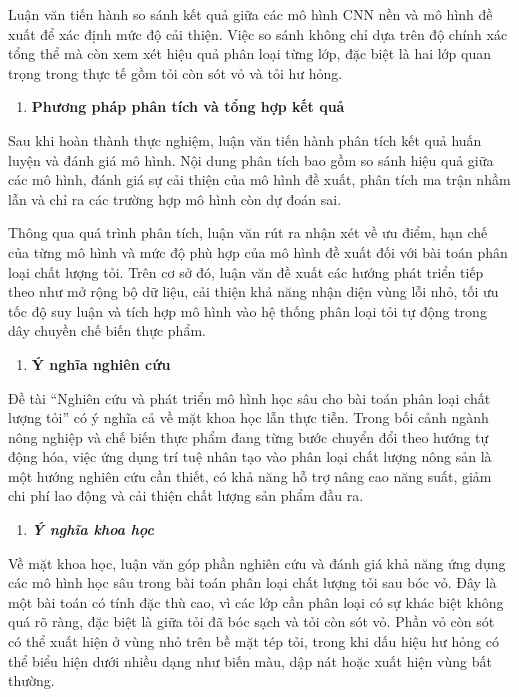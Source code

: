 \documentclass[
]{article}
\begin{document}
Luận văn tiến hành so sánh kết quả giữa các mô hình CNN nền và mô hình
đề xuất để xác định mức độ cải thiện. Việc so sánh không chỉ dựa trên độ
chính xác tổng thể mà còn xem xét hiệu quả phân loại từng lớp, đặc biệt
là hai lớp quan trọng trong thực tế gồm tỏi còn sót vỏ và tỏi hư hỏng.

\begin{enumerate}
\def\labelenumi{\alph{enumi}.}
\setcounter{enumi}{6}
\item
  \textbf{Phương pháp phân tích và tổng hợp kết quả}
\end{enumerate}

Sau khi hoàn thành thực nghiệm, luận văn tiến hành phân tích kết quả
huấn luyện và đánh giá mô hình. Nội dung phân tích bao gồm so sánh hiệu
quả giữa các mô hình, đánh giá sự cải thiện của mô hình đề xuất, phân
tích ma trận nhầm lẫn và chỉ ra các trường hợp mô hình còn dự đoán sai.

Thông qua quá trình phân tích, luận văn rút ra nhận xét về ưu điểm, hạn
chế của từng mô hình và mức độ phù hợp của mô hình đề xuất đối với bài
toán phân loại chất lượng tỏi. Trên cơ sở đó, luận văn đề xuất các hướng
phát triển tiếp theo như mở rộng bộ dữ liệu, cải thiện khả năng nhận
diện vùng lỗi nhỏ, tối ưu tốc độ suy luận và tích hợp mô hình vào hệ
thống phân loại tỏi tự động trong dây chuyền chế biến thực phẩm.

\begin{enumerate}
\def\labelenumi{\arabic{enumi}.}
\setcounter{enumi}{4}
\item
  \protect{}\label{_Toc232111988}{}\textbf{Ý nghĩa nghiên
  cứu}
\end{enumerate}

Đề tài ``Nghiên cứu và phát triển mô hình học sâu cho bài toán phân loại
chất lượng tỏi'' có ý nghĩa cả về mặt khoa học lẫn thực tiễn. Trong bối
cảnh ngành nông nghiệp và chế biến thực phẩm đang từng bước chuyển đổi
theo hướng tự động hóa, việc ứng dụng trí tuệ nhân tạo vào phân loại
chất lượng nông sản là một hướng nghiên cứu cần thiết, có khả năng hỗ
trợ nâng cao năng suất, giảm chi phí lao động và cải thiện chất lượng
sản phẩm đầu ra.

\begin{enumerate}
\def\labelenumi{\arabic{enumi}.}
\item
  \protect{}\label{_Toc232111989}{}\emph{\textbf{Ý nghĩa
  khoa học}}
\end{enumerate}

Về mặt khoa học, luận văn góp phần nghiên cứu và đánh giá khả năng ứng
dụng các mô hình học sâu trong bài toán phân loại chất lượng tỏi sau bóc
vỏ. Đây là một bài toán có tính đặc thù cao, vì các lớp cần phân loại có
sự khác biệt không quá rõ ràng, đặc biệt là giữa tỏi đã bóc sạch và tỏi
còn sót vỏ. Phần vỏ còn sót có thể xuất hiện ở vùng nhỏ trên bề mặt tép
tỏi, trong khi dấu hiệu hư hỏng có thể biểu hiện dưới nhiều dạng như
biến màu, dập nát hoặc xuất hiện vùng bất thường.
\end{document}
